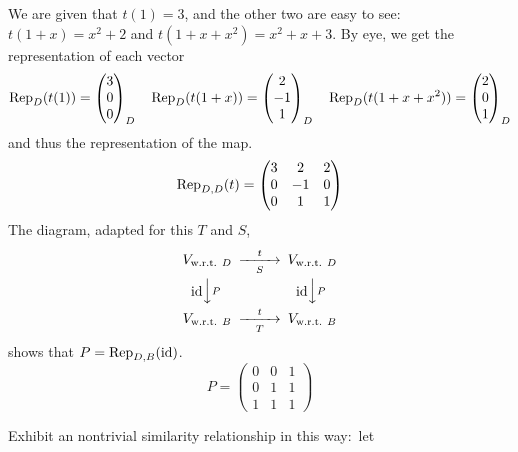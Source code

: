 \begin{exercises}
\begin{answer}
\begin{exparts}
          We are given that $t(1)=3$, and the other two are easy to see:
          $t(1+x)=x^2+2$ and $t(1+x+x^2)=x^2+x+3$.
          By eye, we get the representation of each vector
          \begin{equation*}
            \rep{t(1)}{D}=\colvec{3 \\ 0 \\ 0}_D
            \quad
            \rep{t(1+x)}{D}=\colvec{2  \\ -1 \\  1}_D
            \quad
            \rep{t(1+x+x^2)}{D}=\colvec{2 \\ 0 \\ 1}_D
          \end{equation*}
          and thus the representation of the map.
          \begin{equation*}
            \rep{t}{D,D}
            =
            \begin{pmatrix}
              3  &2  &2  \\
              0  &-1 &0  \\
              0  &1  &1
            \end{pmatrix}
          \end{equation*}
         \partsitem The diagram, adapted for this $T$ and $S$,
           \begin{equation*}
             \begin{CD}
               V_\wrt{D}                  @>t>S>  V_\wrt{D}       \\
               @V\scriptstyle\identity VPV      @V\scriptstyle\identity VPV \\
               V_\wrt{B}                  @>t>T>  V_\wrt{B}
             \end{CD}
           \end{equation*}
           shows that $P=\rep{\identity}{D,B}$.
           \begin{equation*}
             P=
             \begin{pmatrix}
               0  &0  &1  \\ 
               0  &1  &1  \\
               1  &1  &1 
             \end{pmatrix}
           \end{equation*}
      \end{exparts}
    \end{answer}
  \recommended \item
     Exhibit an nontrivial similarity relationship in this way:~let

\end{exercises}
